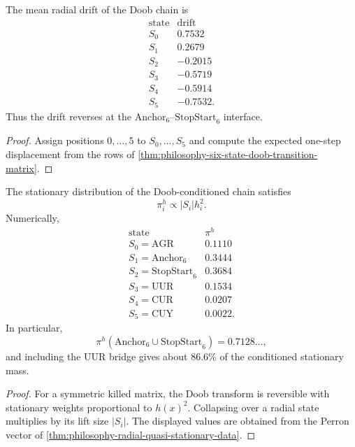 \begin{corollary}
\label{cor:philosophy-conditioned-survival-central-drift}
The mean radial drift of the Doob chain is
$$
\begin{array}{c|r}
  \text{state} & \text{drift}\\
  \hline
  S_{0} & 0.7532\\
  S_{1} & 0.2679\\
  S_{2} & -0.2015\\
  S_{3} & -0.5719\\
  S_{4} & -0.5914\\
  S_{5} & -0.7532.
\end{array}
$$
Thus the drift reverses at the
$\mathrm{Anchor}_{6}$--$\mathrm{StopStart}_{6}$ interface.
\end{corollary}
\begin{proof}
Assign positions $0,\ldots,5$ to $S_{0},\ldots,S_{5}$ and compute the
expected one-step displacement from the rows of
\autoref{thm:philosophy-six-state-doob-transition-matrix}.
\end{proof}

\begin{theorem}
\label{thm:philosophy-doob-stationary-distribution}
The stationary distribution of the Doob-conditioned chain satisfies
$$
  \pi^{h}_{i}\propto |S_{i}|h_{i}^{2}.
$$
Numerically,
$$
\begin{array}{c|r}
  \text{state} & \pi^{h}\\
  \hline
  S_{0}=\mathrm{AGR} & 0.1110\\
  S_{1}=\mathrm{Anchor}_{6} & 0.3444\\
  S_{2}=\mathrm{StopStart}_{6} & 0.3684\\
  S_{3}=\mathrm{UUR} & 0.1534\\
  S_{4}=\mathrm{CUR} & 0.0207\\
  S_{5}=\mathrm{CUY} & 0.0022.
\end{array}
$$
In particular,
$$
  \pi^{h}(\mathrm{Anchor}_{6}\cup\mathrm{StopStart}_{6})
  =
  0.7128\ldots,
$$
and including the $\mathrm{UUR}$ bridge gives about $86.6\%$ of the
conditioned stationary mass.
\end{theorem}
\begin{proof}
For a symmetric killed matrix, the Doob transform is reversible with
stationary weights proportional to $h(x)^{2}$. Collapsing over a radial
state multiplies by its lift size $|S_{i}|$. The displayed values are
obtained from the Perron vector of
\autoref{thm:philosophy-radial-quasi-stationary-data}.
\end{proof}

